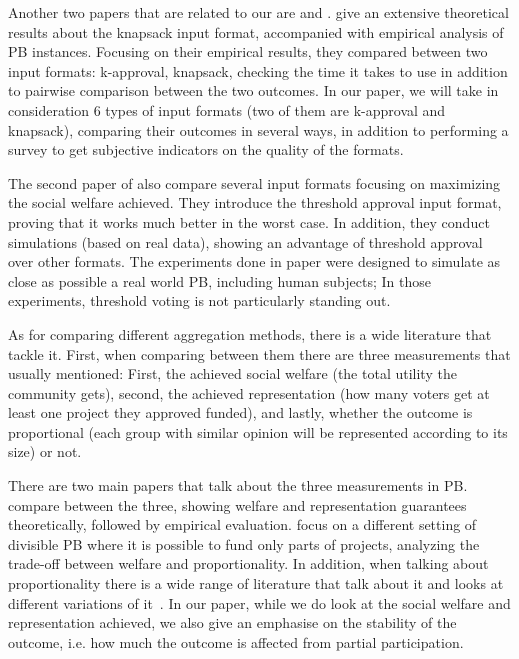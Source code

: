 \documentclass[10pt]{article}
\begin{document}
Another two papers that are related to our are \citet{goel2019knapsack} and \citet{benade2020preference}. \citet{goel2019knapsack} give an extensive theoretical results about the knapsack input format, accompanied with empirical analysis of PB instances. Focusing on their empirical results, they compared between two input formats: k-approval, knapsack, checking the time it takes to use in addition to pairwise comparison between the two outcomes. In our paper, we will take in consideration 6 types of input formats (two of them are k-approval and knapsack), comparing their outcomes in several ways, in addition to performing a survey to get subjective indicators on the quality of the formats.

The second paper of \citet{benade2020preference} also compare several input formats focusing on maximizing the social welfare achieved. They introduce the threshold approval input format, proving that it works much better in the worst case. In addition, they conduct simulations (based on real data), showing an advantage of threshold approval over other formats. The experiments done in paper were designed to simulate as close as possible a real world PB, including human subjects; In those experiments, threshold voting  is not particularly standing out.

As for comparing different aggregation methods, there is a wide literature that tackle it. First, when comparing between them there are three measurements that usually mentioned: First, the achieved social welfare (the total utility the community gets), second, the achieved representation (how many voters get at least one project they approved funded), and lastly, whether the outcome is proportional (each group with similar opinion will be represented according to its size) or not.

There are two main papers that talk about the three measurements in PB. \citet{fairstein2022welfare} compare between the three, showing welfare and representation guarantees theoretically, followed by empirical evaluation. \citet{michorzewski2020price} focus on a different setting of divisible PB where it is possible to fund only parts of projects, analyzing the trade-off between welfare and proportionality. In addition, when talking about proportionality there is a wide range of literature that talk about it and looks at different variations of it~\cite{peters2020proportional, fain2016core, fain2018fair, aziz2018proportionally, aziz2017justified, sanchez2017proportional, skowron2020participatory}. In our paper, while we do look at the social welfare and representation achieved, we also give an emphasise on the stability of the outcome, i.e. how much the outcome is affected from partial participation.
\end{document}
